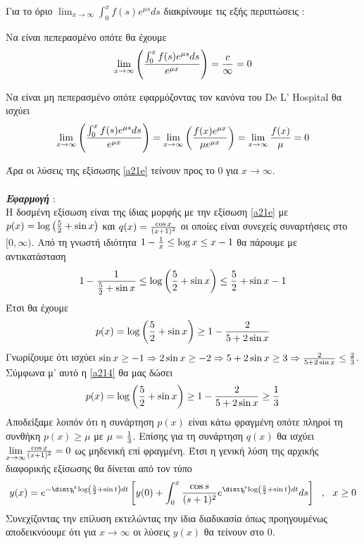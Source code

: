 \documentclass[a4paper,twoside,11pt]{book}
\newcommand{\epask}{\\\\\\}
\DeclareRobustCommand{\frac}[3][0pt]{%
{\begingroup\hspace{#1}#2\hspace{#1}\endgroup\over\hspace{#1}#3\hspace{#1}}}
\begin{document}
Για το όριο $ \displaystyle\lim_{x\rightarrow\infty}\int_{0}^{x}f(s)e^{\mu s}ds $ διακρίνουμε τις εξής περιπτώσεις :
\begin{rlist}
\item Να είναι πεπερασμένο οπότε θα έχουμε
\[ \lim_{x\rightarrow\infty}{\left(\frac{\int_{0}^{x}f(s)e^{\mu s}ds}{e^{\mu x}}\right)}=\frac{c}{\infty}=0 \]
\item Να είναι μη πεπερασμένο οπότε εφαρμόζοντας τον κανόνα του De L' Hospital θα ισχύει
\[ \lim_{x\rightarrow\infty}{\left(\frac{\int_{0}^{x}f(s)e^{\mu s}ds}{e^{\mu x}}\right)}=\lim_{x\rightarrow\infty}{\left(\frac{f(x)e^{\mu x}}{\mu e^{\mu x}}\right)}=\lim_{x\rightarrow\infty}\frac{f(x)}{\mu}=0 \]
\end{rlist}
Άρα οι λύσεις της εξίσωσης \eqref{a21e} τείνουν προς το $ 0 $ για $ x\rightarrow\infty $.\\\\
\textit{\textbf{Εφαρμογή}} :\\
Η δοσμένη εξίσωση είναι της ίδιας μορφής με την εξίσωση \eqref{a21e} με $ p(x)=\log\left(\frac{5}{2}+\sin{x} \right) $ και $ q(x)=\frac{\cos{x}}{(x+1)^2} $ οι οποίες είναι συνεχείς συναρτήσεις στο $ [0,\infty) $. Από τη γνωστή ιδιότητα $ 1-\frac{1}{x}\leq\log{x}\leq x-1 $ θα πάρουμε με αντικατάσταση
\[ 1-\frac{1}{\frac{5}{2}+\sin{x}}\leq\log{\left( \frac{5}{2}+\sin{x}\right) }\leq \frac{5}{2}+\sin{x}-1 \]
Έτσι θα έχουμε
\begin{equation}\label{a214}
p(x)=\log\left(\frac{5}{2}+\sin{x} \right)\geq 1-\frac{2}{5+2\sin{x}}
\end{equation}
Γνωρίζουμε ότι ισχύει $ \sin{x}\geq-1\Rightarrow 2\sin{x}\geq-2\Rightarrow 5+2\sin{x}\geq3\Rightarrow \frac{2}{5+2\sin{x}}\leq \frac{2}{3} $. Σύμφωνα μ' αυτό η \eqref{a214} θα μας δώσει
\[ p(x)=\log\left(\frac{5}{2}+\sin{x} \right)\geq 1-\frac{2}{5+2\sin{x}}\geq\frac{1}{3} \]
Αποδείξαμε λοιπόν ότι η συνάρτηση $ p(x) $ είναι κάτω φραγμένη οπότε πληροί τη συνθήκη $ p(x)\geq\mu $ με $ \mu=\frac{1}{3} $. Επίσης για τη συνάρτηση $ q(x) $ θα ισχύει $ {\displaystyle{\lim_{x\rightarrow\infty}}}{\frac{\cos{x}}{(x+1)^2}=0} $ ως μηδενική επί φραγμένη. Έτσι η γενική λύση της αρχικής διαφορικής εξίσωσης θα δίνεται από τον τύπο
\[ y(x)=e^{-\dintt_{\!\!0}^{x}{\log\left(\frac{5}{2}+\sin{t}\right) dt}}\left[y(0)+\int_{0}^{x}{\frac{\cos{s}}{(s+1)^2}e^{\dintt_{\!\!0}^{s}{\log\left(\frac{5}{2}+\sin{t}\right)dt}}ds} \right]\ \ ,\ \ x\geq0 \]
Συνεχίζοντας την επίλυση εκτελώντας την ίδια διαδικασία όπως προηγουμένως αποδεικνύουμε ότι για $ x\rightarrow\infty $ οι λύσεις $ y(x) $ θα τείνουν στο $ 0 $.\epask
\end{document}
